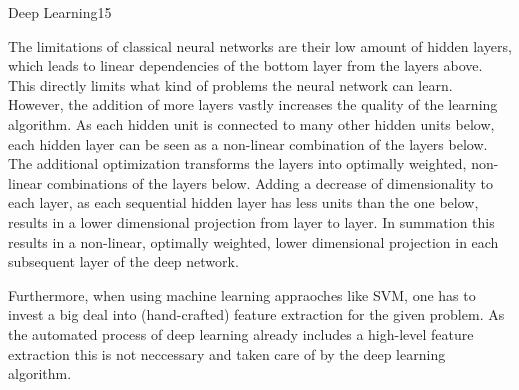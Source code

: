 \begin{questions}
\begin{question}[bonus]{Deep Learning}{15}
\begin{answer}
The limitations of classical neural networks are their low amount of hidden layers, which leads to  linear dependencies of the bottom layer from the layers above. This directly limits what kind of problems the neural network can learn. However, the addition of more layers vastly increases the quality of the learning algorithm. As each hidden unit is connected to many other hidden units below, each hidden layer can be seen as a non-linear combination of the layers below. The additional optimization transforms the layers into optimally weighted, non-linear combinations of the layers below. Adding a decrease of dimensionality to each layer, as each sequential hidden layer has less units than the one below, results in a lower dimensional projection from layer to layer. In summation this results in a non-linear, optimally weighted, lower dimensional projection in each subsequent layer of the deep network.

Furthermore, when using machine learning appraoches like SVM, one has to invest a big deal into (hand-crafted) feature extraction for the given problem. As the automated process of deep learning already includes a high-level feature extraction this is not neccessary and taken care of by the deep learning algorithm.
\end{answer}

\end{question}


\end{questions}
